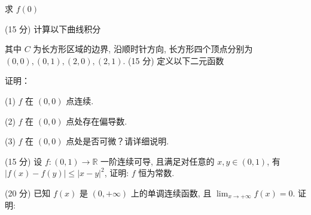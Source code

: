 \nopagebreak[4]
求 $f(0)$\par
\par{}
\par{}
(15 分) 计算以下曲线积分\par
\nopagebreak[4]
\par{}
其中 $C$ 为长方形区域的边界, 沿顺时针方向, 长方形四个顶点分别为 $(0,0), (0,1), (2,0), (2,1)$.
(15 分) 定义以下二元函数\par
\nopagebreak[4]
证明：\par
(1) $f$ 在 $(0,0)$ 点连续.\par
(2) $f$ 在 $(0,0)$ 点处存在偏导数.\par
(3) $f$ 在 $(0,0)$ 点处是否可微？请详细说明.\par
\par{}
(15 分) 设 $f: (0,1) \to \mathbb{R}$ 一阶连续可导, 且满足对任意的 $x, y \in (0,1)$, 有 $|f(x) - f(y)| \leq |x - y|^2$, 证明: $f$ 恒为常数.\par
\par{}
\par{}
(20 分) 已知 $f(x)$ 是 $(0, +\infty)$ 上的单调连续函数, 且 $\lim_{x \to +\infty} f(x) = 0$. 证明:\par
\nopagebreak[4]
